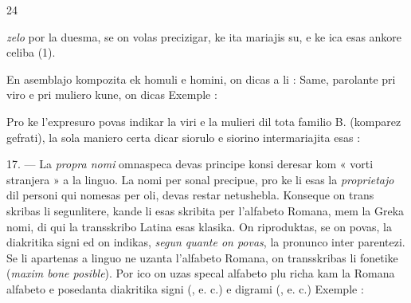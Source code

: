 \begin{VUpage}[28]{24}

\VUcontinue \textit{zelo} por la duesma, se on volas precizigar, ke ita mariajis\nl
su, e ke ica esas ankore celiba (1).

En asemblajo kompozita ek homuli e homini, on dicas a\nl
li :  Same, parolante pri viro e pri muliero kune, on\nl
dicas  Exemple : 

Pro ke l'expresuro  povas indikar la viri e la\nl
mulieri dil tota familio B. (komparez gefrati), la sola\nl
maniero certa dicar siorulo e siorino  intermariajita esas :\nl
{}

\VUsaut{1.00mm}
\VUsaut{3.49mm}

17. --- La \textit{propra nomi} omnaspeca devas principe konsi\cc
deresar kom « vorti stranjera » a la linguo. La nomi per\cc
sonal precipue, pro ke li esas la \textit{proprietajo} dil personi qui\nl
nomesas per oli, devas restar netushebla. Konseque on trans\cc
skribas li segunlitere, kande li esas skribita per l'alfabeto\nl
Romana, mem la Greka nomi, di qui la transskribo Latina\nl
esas klasika. On riproduktas, se on povas, la diakritika\nl
signi ed on indikas, \textit{segun quante on povas}, la pronunco\nl
inter parentezi. Se li apartenas a linguo ne uzanta l'alfabeto\nl
Romana, on transskribas li fonetike (\textit{maxim bone posible}).\nl
Por ico on uzas specal alfabeto plu richa kam la Romana\nl
alfabeto e posedanta diakritika signi (, e. c.) e digrami\nl
(, e. c.) Exemple : \cc
{}\nl
{}\nl
{}


\end{VUpage}
